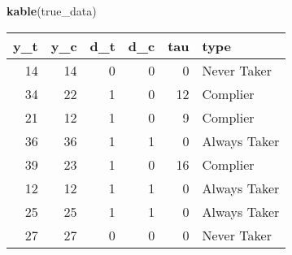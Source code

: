 \documentclass[12pt,leqno]{article}
\newenvironment{Shaded}{\begin{snugshade}}{\end{snugshade}}
\newcommand{\KeywordTok}[1]{\textcolor[rgb]{0.13,0.29,0.53}{\textbf{#1}}}
\newcommand{\NormalTok}[1]{#1}
\theoremstyle{newstyle}
\begin{document}
\begin{Shaded}
\begin{Highlighting}[]
\KeywordTok{kable}\NormalTok{(true\_data)}
\end{Highlighting}
\end{Shaded}

\begin{longtable}[]{@{}rrrrrl@{}}
\toprule
y\_t & y\_c & d\_t & d\_c & tau & type\tabularnewline
\midrule
\endhead
14 & 14 & 0 & 0 & 0 & Never Taker\tabularnewline
34 & 22 & 1 & 0 & 12 & Complier\tabularnewline
21 & 12 & 1 & 0 & 9 & Complier\tabularnewline
36 & 36 & 1 & 1 & 0 & Always Taker\tabularnewline
39 & 23 & 1 & 0 & 16 & Complier\tabularnewline
12 & 12 & 1 & 1 & 0 & Always Taker\tabularnewline
25 & 25 & 1 & 1 & 0 & Always Taker\tabularnewline
27 & 27 & 0 & 0 & 0 & Never Taker\tabularnewline
\bottomrule
\end{longtable}
\end{document}
